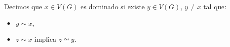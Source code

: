 \documentclass[beamer]{standalone}
\begin{document}
\begin{standaloneframe}
  Decimos que $x\in V(G)$ es \alert{dominado} si existe $y\in V(G)$,
  $y\ne x$ tal que:
  \begin{itemize}
  \item $y\sim x$,\pause
  \item $z\sim x$ implica $z\simeq y$.
  \end{itemize}
\end{standaloneframe}
\end{document}
